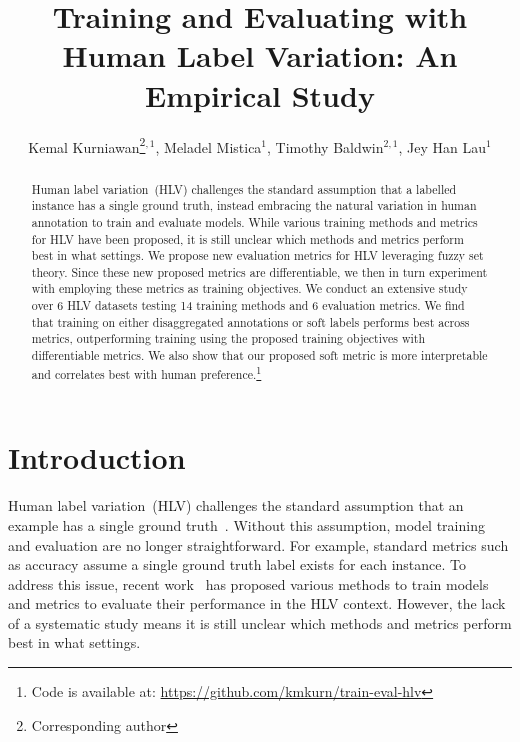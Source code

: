\documentclass[shortpaper]{clv2025}
\begin{document}
\title{Training and Evaluating with Human Label Variation: An Empirical Study}

\author{Kemal Kurniawan\thanks{Corresponding author}$^{,1}$, Meladel
  Mistica$^{1}$, Timothy Baldwin$^{2,1}$, Jey Han Lau$^{1}$}


\maketitle

\begin{abstract}
  Human label variation~(HLV) challenges the standard assumption that
  a labelled instance has a single ground truth, instead embracing the natural
  variation in human annotation to train and evaluate models. While
  various training methods and metrics for HLV have been proposed,
  it is still unclear which methods and metrics perform best in what settings.
  We propose new evaluation metrics for HLV leveraging fuzzy set theory.
  Since these new proposed metrics are differentiable, we then in turn
  experiment with employing these metrics as training objectives. We conduct an
  extensive study over 6 HLV datasets testing 14 training methods and 6
  evaluation metrics. We find that training on either disaggregated annotations
  or soft labels performs best across metrics, outperforming training using the
  proposed training objectives with differentiable metrics. We also show that
  our proposed soft metric is more interpretable and correlates best with human
  preference.\footnote{Code is available at:
    \url{https://github.com/kmkurn/train-eval-hlv}}
\end{abstract}

\section{Introduction}

Human label variation~(HLV) challenges the standard assumption that an
example has a single ground truth~\citep{plank2022}. Without this
assumption, model training and evaluation are no longer straightforward. For
example, standard metrics such as accuracy assume a single ground truth label
exists for each instance. To address this issue, recent
work~\citep[\textit{inter
  alia}]{pavlick2019,peterson2019,nie2020,uma2020,uma2021,cui2023,gajewska2023,maity2023,wan2023}
has proposed various methods to train models and metrics to evaluate their
performance in the HLV context. However, the lack of a systematic study means it
is still unclear which methods and metrics perform best in what settings.
\end{document}
